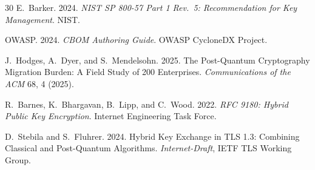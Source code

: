 \documentclass[sigconf,nonacm]{acmart}
\begin{document}
\begin{thebibliography}{30}
E.~Barker. 2024. \textit{NIST SP 800-57 Part 1 Rev.\ 5: Recommendation
for Key Management}. NIST.

OWASP. 2024. \textit{CBOM Authoring Guide}. OWASP CycloneDX Project.

J.~Hodges, A.~Dyer, and S.~Mendelsohn. 2025. The Post-Quantum
Cryptography Migration Burden: A Field Study of 200 Enterprises.
\textit{Communications of the ACM} 68, 4 (2025).

R.~Barnes, K.~Bhargavan, B.~Lipp, and C.~Wood. 2022. \textit{RFC 9180:
Hybrid Public Key Encryption}. Internet Engineering Task Force.

D.~Stebila and S.~Fluhrer. 2024. Hybrid Key Exchange in TLS 1.3:
Combining Classical and Post-Quantum Algorithms. \textit{Internet-Draft},
IETF TLS Working Group.

\end{thebibliography}
\end{document}
